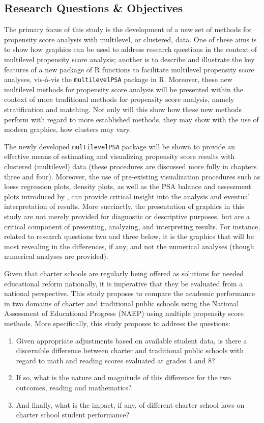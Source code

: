 \documentclass[letterpaper,12p,twoside]{article} %
\begin{document}
\subsection{Research Questions \& Objectives} 
The primary focus of this study is the development of a new set of methods for propensity score analysis with multilevel, or clustered, data. One of these aims is to show how graphics can be used to address research questions in the context of multilevel propensity score analysis; another is to describe and illustrate the key features of a new package of R functions to facilitate multilevel propensity score analyses, vis-\`{a}-vis the \texttt{multilevelPSA} package in R. Moreover, these new multilevel methods for propensity score analysis will be presented within the context of more traditional methods for propensity score analysis, namely stratification and matching. Not only will this show how these new methods perform with regard to more established methods, they may show with the use of modern graphics, how clusters may vary. 

The newly developed \texttt{multilevelPSA} package will be shown to provide an effective means of estimating and visualizing propensity score results with clustered (multilevel) data (these procedures are discussed more fully in chapters three and four). Moreover, the use of pre-existing visualization procedures such as loess regression plots, density plots, as well as the PSA balance and assessment plots introduced by , can provide critical insight into the analysis and eventual interpretation of results. More succinctly, the presentation of graphics in this study are not merely provided for diagnostic or descriptive purposes, but are a critical component of presenting, analyzing, and interpreting results. For instance, related to research questions two and three below, it is the graphics that will be most revealing in the differences, if any, and not the numerical analyses (though numerical analyses are provided).

Given that charter schools are regularly being offered as solutions for needed educational reform nationally, it is imperative that they be evaluated from a national perspective. This study proposes to compare the academic performance in two domains of charter and traditional public schools using the National Assessment of Educational Progress (NAEP) using multiple propensity score methods. More specifically, this study proposes to address the questions:

\begin{enumerate} 
	\item Given appropriate adjustments based on available student data, is there a discernible difference between charter and traditional public schools with regard to math and reading scores evaluated at grades 4 and 8?
	\item If so, what is the nature and magnitude of this difference for the two outcomes, reading and mathematics?
	\item And finally, what is the impact, if any, of different charter school laws on charter school student performance?
\end{enumerate}
\end{document}
